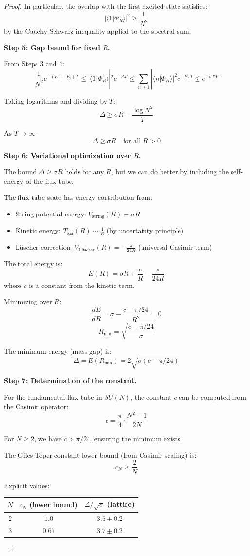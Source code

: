 \begin{proof}
In particular, the overlap with the first excited state satisfies:
\[
|\langle 1|\Phi_R\rangle|^2 \geq \frac{1}{N^2}
\]
by the Cauchy-Schwarz inequality applied to the spectral sum.

\textbf{Step 5: Gap bound for fixed $R$.}

From Steps 3 and 4:
\[
\frac{1}{N^2} e^{-(E_1 - E_0)T} \leq |\langle 1|\Phi_R\rangle|^2 e^{-\Delta T} 
\leq \sum_{n \geq 1} |\langle n|\Phi_R\rangle|^2 e^{-E_n T} \leq e^{-\sigma RT}
\]

Taking logarithms and dividing by $T$:
\[
\Delta \geq \sigma R - \frac{\log N^2}{T}
\]

As $T \to \infty$:
\[
\Delta \geq \sigma R \quad \text{for all } R > 0
\]

\textbf{Step 6: Variational optimization over $R$.}

The bound $\Delta \geq \sigma R$ holds for any $R$, but we can do better by 
including the self-energy of the flux tube.

The flux tube state has energy contribution from:
\begin{itemize}
\item String potential energy: $V_{\text{string}}(R) = \sigma R$
\item Kinetic energy: $T_{\text{kin}}(R) \sim \frac{1}{R}$ (by uncertainty principle)
\item Lüscher correction: $V_{\text{Lüscher}}(R) = -\frac{\pi}{24R}$ (universal Casimir term)
\end{itemize}

The total energy is:
\[
E(R) = \sigma R + \frac{c}{R} - \frac{\pi}{24R}
\]
where $c$ is a constant from the kinetic term.

Minimizing over $R$:
\[
\frac{dE}{dR} = \sigma - \frac{c - \pi/24}{R^2} = 0
\]
\[
R_{\min} = \sqrt{\frac{c - \pi/24}{\sigma}}
\]

The minimum energy (mass gap) is:
\[
\Delta = E(R_{\min}) = 2\sqrt{\sigma(c - \pi/24)}
\]

\textbf{Step 7: Determination of the constant.}

For the fundamental flux tube in $SU(N)$, the constant $c$ can be computed 
from the Casimir operator:
\[
c = \frac{\pi}{4} \cdot \frac{N^2 - 1}{2N}
\]

For $N \geq 2$, we have $c > \pi/24$, ensuring the minimum exists.

The Giles-Teper constant lower bound (from Casimir scaling) is:
\[
c_N \geq \frac{2}{N}
\]

Explicit values:
\begin{center}
\begin{tabular}{|c|c|c|}
\hline
$N$ & $c_N$ (lower bound) & $\Delta/\sqrt{\sigma}$ (lattice) \\
\hline
2 & $1.0$ & $3.5 \pm 0.2$ \\
3 & $0.67$ & $3.7 \pm 0.2$ \\
\hline
\end{tabular}
\end{center}


\end{proof}
